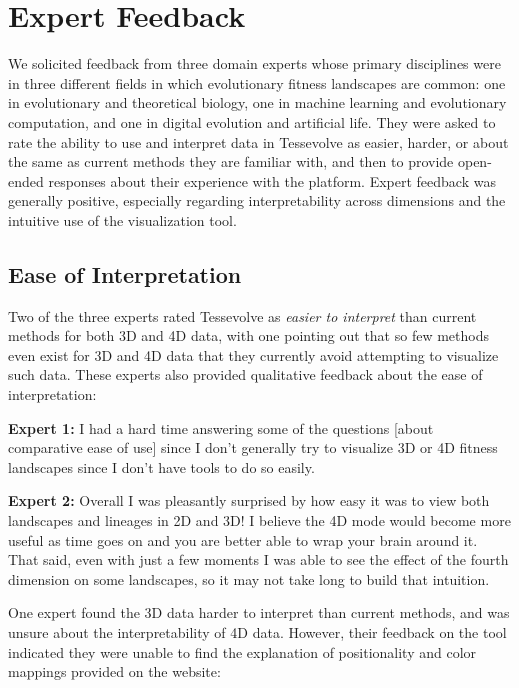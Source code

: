 \section{Expert Feedback}
We solicited feedback from three domain experts whose primary disciplines were in three different fields in which evolutionary fitness landscapes are common: one in evolutionary and theoretical biology, one in machine learning and evolutionary computation, and one in digital evolution and artificial life. They were asked to rate the ability to use and interpret data in Tessevolve as easier, harder, or about the same as current methods they are familiar with, and then to provide open-ended responses about their experience with the platform. Expert feedback was generally positive, especially regarding interpretability across dimensions and the intuitive use of the visualization tool.  

\subsection{Ease of Interpretation}

Two of the three experts rated Tessevolve as \textit{easier to interpret} than current methods for both 3D and 4D data, with one pointing out that so few methods even exist for 3D and 4D data that they currently avoid attempting to visualize such data. These experts also provided qualitative feedback about the ease of interpretation:

\begin{displayquote}

\textbf{Expert 1:}  I had a hard time answering some of the questions [about comparative ease of use] since I don't generally try to visualize 3D or 4D fitness landscapes since I don't have tools to do so easily.

\textbf{Expert 2:} Overall I was pleasantly surprised by how easy it was to view both landscapes and lineages in 2D and 3D! I believe the 4D mode would become more useful as time goes on and you are better able to wrap your brain around it. That said, even with just a few moments I was able to see the effect of the fourth dimension on some landscapes, so it may not take long to build that intuition. 


\end{displayquote}


One expert found the 3D data harder to interpret than current methods, and was unsure about the interpretability of 4D data. However, their feedback on the tool indicated they were unable to find the explanation of positionality and color mappings provided on the website:

